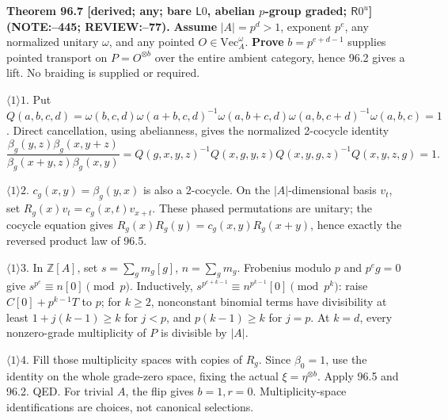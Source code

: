 \textbf{Theorem 96.7 [derived; any; bare \(\mathsf L0\), abelian \(p\)-group graded; \(\mathsf R0^u\)] (NOTE:--445; REVIEW:--77).}
\textbf{Assume} \(|A|=p^d>1\), exponent \(p^e\), any normalized unitary \(\omega\), and any pointed
\(O\in\mathrm{Vec}_A^\omega\). \textbf{Prove} \(b=p^{e+d-1}\) supplies pointed transport on \(P=O^{\otimes b}\)
over the entire ambient category, hence 96.2 gives a lift. No braiding is supplied or required.
\par\(\langle1\rangle1\). Put
\(Q(a,b,c,d)=\omega(b,c,d)\omega(a+b,c,d)^{-1}\omega(a,b+c,d)\omega(a,b,c+d)^{-1}\omega(a,b,c)=1\).
Direct cancellation, using abelianness, gives the normalized 2-cocycle identity
\[
 \frac{\beta_g(y,z)\beta_g(x,y+z)}{\beta_g(x+y,z)\beta_g(x,y)}
 =Q(g,x,y,z)^{-1}Q(x,g,y,z)Q(x,y,g,z)^{-1}Q(x,y,z,g)=1.
\]
\par\(\langle1\rangle2\). \(c_g(x,y)=\beta_g(y,x)\) is also a 2-cocycle. On the \(|A|\)-dimensional basis
\(v_t\), set \(R_g(x)v_t=c_g(x,t)v_{x+t}\). These phased permutations are unitary; the cocycle equation gives
\(R_g(x)R_g(y)=c_g(x,y)R_g(x+y)\), hence exactly the reversed product law of 96.5.
\par\(\langle1\rangle3\). In \(\mathbb Z[A]\), set \(s=\sum_gm_g[g]\), \(n=\sum_gm_g\).
Frobenius modulo \(p\) and \(p^eg=0\) give \(s^{p^e}\equiv n[0]\pmod p\). Inductively,
\(s^{p^{e+k-1}}\equiv n^{p^{k-1}}[0]\pmod{p^k}\): raise \(C[0]+p^{k-1}T\) to \(p\);
for \(k\ge2\), nonconstant binomial terms have divisibility at least \(1+j(k-1)\ge k\) for \(j<p\),
and \(p(k-1)\ge k\) for \(j=p\). At \(k=d\), every nonzero-grade multiplicity of \(P\) is divisible by \(|A|\).
\par\(\langle1\rangle4\). Fill those multiplicity spaces with copies of \(R_g\). Since \(\beta_0=1\), use the
identity on the whole grade-zero space, fixing the actual \(\xi=\eta^{\otimes b}\). Apply 96.5 and 96.2. QED.
For trivial \(A\), the flip gives \(b=1,r=0\). Multiplicity-space identifications are choices, not canonical selections.

